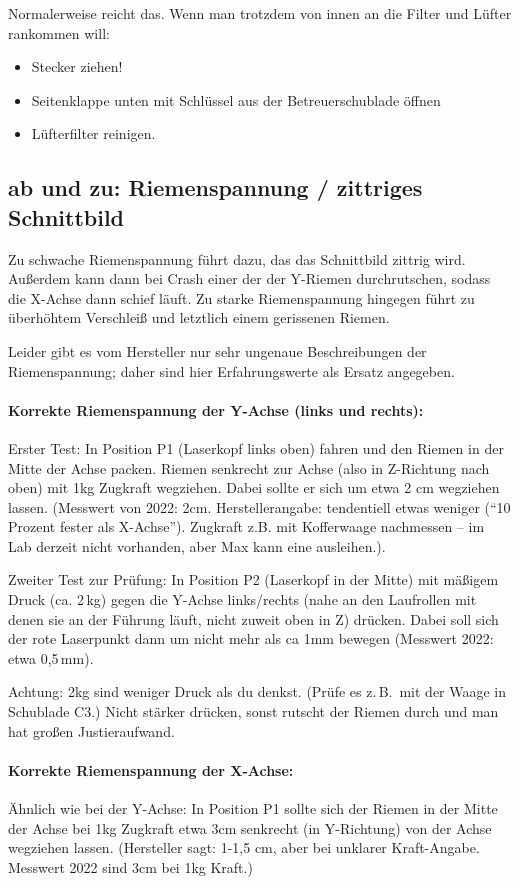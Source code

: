 \documentclass{\basedir/fablab-document}
\begin{document}
	Normalerweise reicht das. Wenn man trotzdem von innen an die Filter und Lüfter rankommen will:
	\begin{itemize}
		\item Stecker ziehen!
		\item Seitenklappe unten mit Schlüssel aus der Betreuerschublade öffnen
		\item Lüfterfilter reinigen.
	\end{itemize}

\subsection{ab und zu: Riemenspannung / zittriges Schnittbild}
	Zu schwache Riemenspannung führt dazu, das das Schnittbild zittrig wird. Außerdem kann dann bei Crash einer der der Y-Riemen durchrutschen, sodass die X-Achse dann schief läuft. Zu starke Riemenspannung hingegen führt zu überhöhtem Verschleiß und letztlich einem gerissenen Riemen.

	Leider gibt es vom Hersteller nur sehr ungenaue Beschreibungen der Riemenspannung; daher sind hier Erfahrungswerte als Ersatz angegeben.

	\paragraph{Korrekte Riemenspannung der Y-Achse (links und rechts):} Erster Test: In Position P1 (Laserkopf links oben) fahren und den Riemen in der Mitte der Achse packen. Riemen senkrecht zur Achse (also in Z-Richtung nach oben) mit 1kg Zugkraft wegziehen. Dabei sollte er sich um etwa 2 cm wegziehen lassen. (Messwert von 2022: 2cm. Herstellerangabe: tendentiell etwas weniger (\enquote{10 Prozent fester als X-Achse}). Zugkraft z.B. mit Kofferwaage nachmessen -- im Lab derzeit nicht vorhanden, aber Max kann eine ausleihen.).

	Zweiter Test zur Prüfung: In Position P2 (Laserkopf in der Mitte) mit mäßigem Druck (ca. 2\,kg) gegen die Y-Achse links/rechts (nahe an den Laufrollen mit denen sie an der Führung läuft, nicht zuweit oben in Z) drücken. Dabei soll sich der rote Laserpunkt dann um nicht mehr als ca 1mm bewegen (Messwert 2022: etwa 0,5\,mm).

	Achtung: 2kg sind weniger Druck als du denkst. (Prüfe es z.\,B.\ mit der Waage in Schublade C3.) Nicht stärker drücken, sonst rutscht der Riemen durch und man hat großen Justieraufwand.

	
	\paragraph{Korrekte Riemenspannung der X-Achse:} Ähnlich wie bei der Y-Achse: In Position P1 sollte sich der Riemen in der Mitte der Achse bei 1kg Zugkraft etwa 3cm senkrecht (in Y-Richtung) von der Achse wegziehen lassen. (Hersteller sagt: 1-1,5 cm, aber bei unklarer Kraft-Angabe. Messwert 2022 sind 3cm bei 1kg Kraft.)
	
\end{document}
